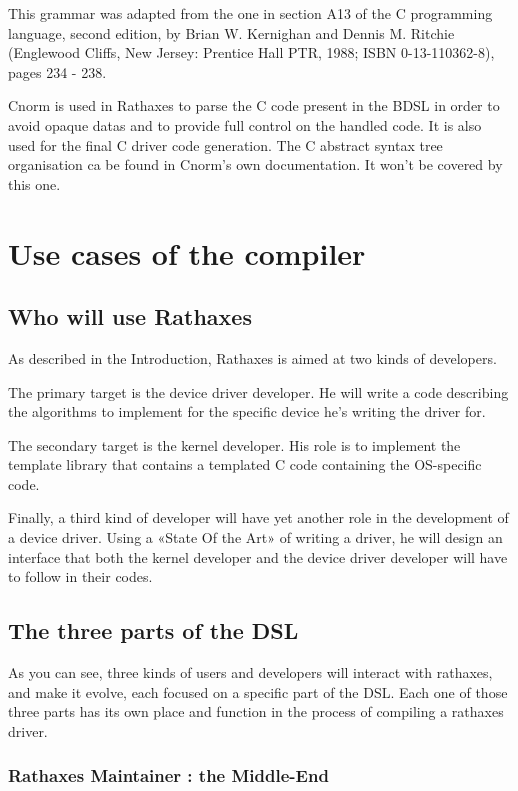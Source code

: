 \documentclass{rtxreport}
\begin{document}
This grammar was adapted from the one in section A13 of the C programming
language, second edition, by Brian W. Kernighan and Dennis M. Ritchie
(Englewood Cliffs, New Jersey: Prentice Hall PTR, 1988; ISBN 0-13-110362-8),
pages 234 - 238. 

Cnorm is used in Rathaxes to parse the C code present in the BDSL in order to
avoid opaque datas and to provide full control on the handled code. It is also
used for the final C driver code generation. The C abstract syntax tree
organisation ca be found in Cnorm's own documentation. It won't be covered by
this one.



\chapter{Use cases of the compiler}

\section{Who will use Rathaxes}

As described in the Introduction, Rathaxes is aimed at two kinds of developers.

The primary target is the device driver developer. He will write a code
describing the algorithms to implement for the specific device he's writing
the driver for.

The secondary target is the kernel developer. His role is to implement the
template library that contains a templated C code containing the
OS-specific code.

Finally, a third kind of developer will have yet another role in the
development of a device driver. Using a «State Of the Art» of writing a
driver, he will design an interface that both the kernel developer and
the device driver developer will have to follow in their codes.

\section{The three parts of the DSL}

As you can see, three kinds of users and developers will interact with rathaxes,
and make it evolve, each focused on a specific part of the DSL.
Each one of those three parts has its own place and function in the process of
compiling a rathaxes driver.

\subsection{Rathaxes Maintainer : the Middle-End}
\lstset{language=rti}
\end{document}
